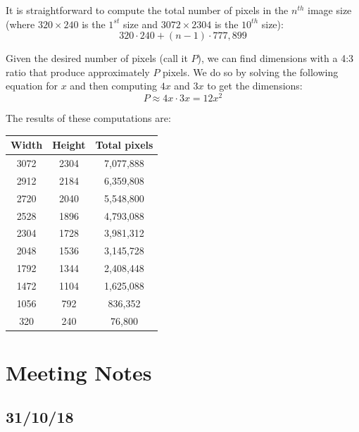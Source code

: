 \documentclass[11pt,a4paper]{report}
\begin{document}
It is straightforward to compute the total number of pixels in the $n^{th}$ image size (where $320 \times 240$ is the $1^{st}$ size and $3072 \times 2304$ is the $10^{th}$ size):
\begin{equation*}
320 \cdot 240 + (n-1) \cdot 777,899
\end{equation*}

Given the desired number of pixels (call it $P$), we can find dimensions with a 4:3 ratio that produce approximately $P$ pixels. We do so by solving the following equation for $x$ and then computing $4x$ and $3x$ to get the dimensions:
\begin{equation*}
 P \approx 4x \cdot 3x = 12x^2
 \end{equation*}

The results of these computations are:
\begin{center}
\begin{tabular}{ c  c | c}
Width & Height & Total pixels \\ \hline
3072 & 2304 & 7,077,888 \\
2912 & 2184 & 6,359,808 \\
2720 & 2040 & 5,548,800 \\
2528 & 1896 & 4,793,088 \\
2304 & 1728 & 3,981,312 \\
2048 & 1536 & 3,145,728 \\
1792 & 1344 & 2,408,448 \\
1472 & 1104 & 1,625,088 \\
1056 & 792 & 836,352 \\
320 & 240 & 76,800 \\
\end{tabular}
\end{center}


\chapter{Meeting Notes}

\section{31/10/18}
\end{document}
